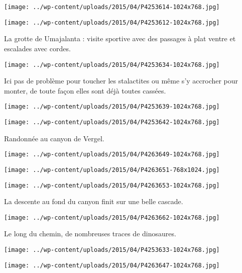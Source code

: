  \newline
 \newline
\centerline{\texttt{[image: ../wp-content/uploads/2015/04/P4253614-1024x768.jpg]} } 
 \newline
 \newline
\centerline{\texttt{[image: ../wp-content/uploads/2015/04/P4253612-1024x768.jpg]} } 
 \newline
 La grotte de Umajalanta : visite sportive avec des passages à plat ventre et escalades avec cordes. \newline
 \newline
\centerline{\texttt{[image: ../wp-content/uploads/2015/04/P4253634-1024x768.jpg]} } 
 \newline
 Ici pas de problème pour toucher les stalactites ou même s'y accrocher pour monter, de toute façon elles sont déjà toutes cassées. \newline
 \newline
\centerline{\texttt{[image: ../wp-content/uploads/2015/04/P4253639-1024x768.jpg]} } 
 \newline
 \newline
\centerline{\texttt{[image: ../wp-content/uploads/2015/04/P4253642-1024x768.jpg]} } 
 \newline
 Randonnée au canyon de Vergel. \newline
 \newline
\centerline{\texttt{[image: ../wp-content/uploads/2015/04/P4263649-1024x768.jpg]} } 
 \newline
 \newline
\centerline{\texttt{[image: ../wp-content/uploads/2015/04/P4263651-768x1024.jpg]} } 
 \newline
 \newline
\centerline{\texttt{[image: ../wp-content/uploads/2015/04/P4263653-1024x768.jpg]} } 
 \newline
 La descente au fond du canyon finit sur une belle cascade. \newline
 \newline
\centerline{\texttt{[image: ../wp-content/uploads/2015/04/P4263662-1024x768.jpg]} } 
 \newline
 Le long du chemin, de nombreuses traces de dinosaures. \newline
 \newline
\centerline{\texttt{[image: ../wp-content/uploads/2015/04/P4253633-1024x768.jpg]} } 
 \newline
 \newline
\centerline{\texttt{[image: ../wp-content/uploads/2015/04/P4263647-1024x768.jpg]} } 
 \newline

\newpage
 
